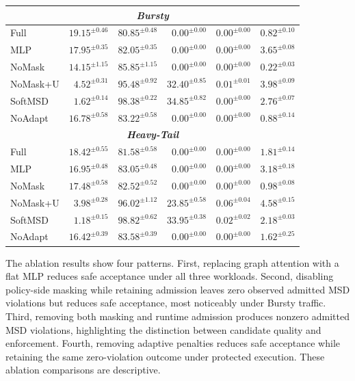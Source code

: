 \documentclass[final,5p]{elsarticle}
\newcommand{\rev}[1]{\textcolor{BrickRed}{#1}}
\begin{document}
\begin{table}[!tb]
{\begin{tabular}{lrrrrr}
\midrule
\multicolumn{6}{c}{\textbf{\textit{Bursty}}} \\
\midrule
Full     & $\mathbf{19.15^{\pm0.46}}$ & $80.85^{\pm0.48}$ & $\mathbf{0.00^{\pm0.00}}$ & $\mathbf{0.00^{\pm0.00}}$ & $0.82^{\pm0.10}$ \\
MLP      & $17.95^{\pm0.35}$          & $82.05^{\pm0.35}$ & $0.00^{\pm0.00}$          & $0.00^{\pm0.00}$          & $3.65^{\pm0.08}$ \\
NoMask   & $14.15^{\pm1.15}$          & $85.85^{\pm1.15}$ & $0.00^{\pm0.00}$          & $0.00^{\pm0.00}$          & $\mathbf{0.22^{\pm0.03}}$ \\
NoMask+U & $4.52^{\pm0.31}$           & $95.48^{\pm0.92}$ & $32.40^{\pm0.85}$         & $0.01^{\pm0.01}$          & $3.98^{\pm0.09}$ \\
SoftMSD  & $1.62^{\pm0.14}$           & $98.38^{\pm0.22}$ & $34.85^{\pm0.82}$         & $0.00^{\pm0.00}$          & $2.76^{\pm0.07}$ \\
NoAdapt  & $16.78^{\pm0.58}$          & $83.22^{\pm0.58}$ & $0.00^{\pm0.00}$          & $0.00^{\pm0.00}$          & $0.88^{\pm0.14}$ \\
\midrule
\multicolumn{6}{c}{\textbf{\textit{Heavy-Tail}}} \\
\midrule
Full     & $\mathbf{18.42^{\pm0.55}}$ & $81.58^{\pm0.58}$ & $\mathbf{0.00^{\pm0.00}}$ & $\mathbf{0.00^{\pm0.00}}$ & $1.81^{\pm0.14}$ \\
MLP      & $16.95^{\pm0.48}$          & $83.05^{\pm0.48}$ & $0.00^{\pm0.00}$          & $0.00^{\pm0.00}$          & $3.18^{\pm0.18}$ \\
NoMask   & $17.48^{\pm0.58}$          & $82.52^{\pm0.52}$ & $0.00^{\pm0.00}$          & $0.00^{\pm0.00}$          & $\mathbf{0.98^{\pm0.08}}$ \\
NoMask+U & $3.98^{\pm0.28}$           & $96.02^{\pm1.12}$ & $23.85^{\pm0.58}$         & $0.06^{\pm0.04}$          & $4.58^{\pm0.15}$ \\
SoftMSD  & $1.18^{\pm0.15}$           & $98.82^{\pm0.62}$ & $33.95^{\pm0.38}$         & $0.02^{\pm0.02}$          & $2.18^{\pm0.03}$ \\
NoAdapt  & $16.42^{\pm0.39}$          & $83.58^{\pm0.39}$ & $0.00^{\pm0.00}$          & $0.00^{\pm0.00}$          & $1.62^{\pm0.25}$ \\
\bottomrule
\end{tabular}
}
\end{table}

\rev{The ablation results show four patterns. First, replacing graph attention with a flat MLP reduces safe acceptance under all three workloads. Second, disabling policy-side masking while retaining admission leaves zero observed admitted MSD violations but reduces safe acceptance, most noticeably under Bursty traffic. Third, removing both masking and runtime admission produces nonzero admitted MSD violations, highlighting the distinction between candidate quality and enforcement. Fourth, removing adaptive penalties reduces safe acceptance while retaining the same zero-violation outcome under protected execution. \rev{These ablation comparisons are descriptive.}}
\end{document}
